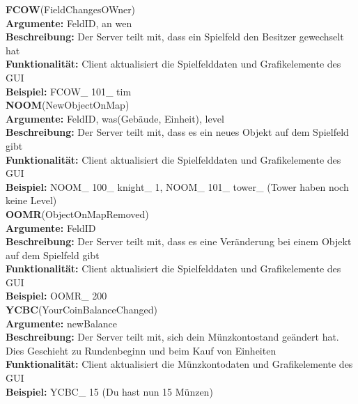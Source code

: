 \documentclass[a4paper, 12pt, oneside, headsepline=.5pt,footsepline=.5pt]{scrartcl}
\begin{document}
{\large \textbf{FCOW}(FieldChangesOWner)} \\
\hspace{4ex} \textbf{Argumente:} {FeldID, an wen} \\
\hspace{4ex} \textbf{Beschreibung:} {Der Server teilt mit, dass ein Spielfeld den Besitzer gewechselt hat} \\
\hspace{4ex} \textbf{Funktionalität:} {Client aktualisiert die Spielfelddaten und Grafikelemente des GUI} \\
\hspace{4ex} \textbf{Beispiel:} {FCOW\_ 101\_ tim} \\

{\large \textbf{NOOM}(NewObjectOnMap)} \\
\hspace{4ex} \textbf{Argumente:} {FeldID, was(Gebäude, Einheit), level} \\
\hspace{4ex} \textbf{Beschreibung:} {Der Server teilt mit, dass es ein neues Objekt auf dem Spielfeld gibt} \\
\hspace{4ex} \textbf{Funktionalität:} {Client aktualisiert die Spielfelddaten und Grafikelemente des GUI} \\
\hspace{4ex} \textbf{Beispiel:} {NOOM\_ 100\_ knight\_ 1, NOOM\_ 101\_ tower\_  (Tower haben noch keine Level)} \\

{\large \textbf{OOMR}(ObjectOnMapRemoved)} \\
\hspace{4ex} \textbf{Argumente:} {FeldID} \\
\hspace{4ex} \textbf{Beschreibung:} {Der Server teilt mit, dass es eine Veränderung bei einem Objekt auf dem Spielfeld gibt} \\
\hspace{4ex} \textbf{Funktionalität:} {Client aktualisiert die Spielfelddaten und Grafikelemente des GUI} \\
\hspace{4ex} \textbf{Beispiel:} {OOMR\_ 200} \\

{\large \textbf{YCBC}(YourCoinBalanceChanged)} \\
\hspace{4ex} \textbf{Argumente:} {newBalance} \\
\hspace{4ex} \textbf{Beschreibung:} {Der Server teilt mit, sich dein Münzkontostand geändert hat. Dies Geschieht zu Rundenbeginn und beim Kauf von Einheiten} \\
\hspace{4ex} \textbf{Funktionalität:} {Client aktualisiert die Münzkontodaten und Grafikelemente des GUI} \\
\hspace{4ex} \textbf{Beispiel:} {YCBC\_ 15 (Du hast nun 15 Münzen)} \\
\end{document}
